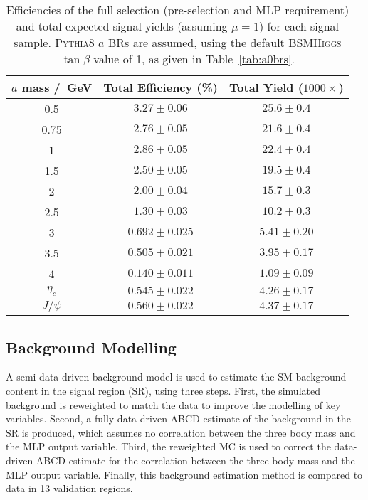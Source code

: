\documentclass[NOTE, atlasdraft=true, texlive=2017, UKenglish]{\ATLASLATEXPATH atlasdoc}
\begin{document}
\begin{table}[!htbp]{\footnotesize\renewcommand{\arraystretch}{1.2}
  \begin{center}
    \footnotesize
    \begin{tabular}{|c|cc|}
      \hline
      $a$ mass /~GeV & Total Efficiency (\%) & Total Yield ($1000\times$) \\
      \hline
      0.5 & $3.27 \pm 0.06$ & $25.6 \pm 0.4$ \\
      0.75 & $2.76 \pm 0.05$ & $21.6 \pm 0.4$ \\
      1 & $2.86 \pm 0.05$ & $22.4 \pm 0.4$ \\
      1.5 & $2.50 \pm 0.05$ & $19.5 \pm 0.4$ \\
      2 & $2.00 \pm 0.04$ & $15.7 \pm 0.3$ \\
      2.5 & $1.30 \pm 0.03$ & $10.2 \pm 0.3$ \\
      3 & $0.692 \pm 0.025$ & $5.41 \pm 0.20$ \\
      3.5 & $0.505 \pm 0.021$ & $3.95 \pm 0.17$ \\
      4 & $0.140 \pm 0.011$ & $1.09 \pm 0.09$ \\
      \hline
      $\eta_c$ & $0.545 \pm 0.022$ & $4.26 \pm 0.17$ \\
      $J/\psi$ & $0.560 \pm 0.022$ & $4.37 \pm 0.17$ \\
      \hline
    \end{tabular}
    \caption{Efficiencies of the full selection (pre-selection and MLP requirement) and total expected signal yields (assuming $\mu=1$) for each signal sample. \textsc{Pythia}8 $a$ BRs are assumed, using the default \textsc{BSMHiggs} $\tan\beta$ value of 1, as given in Table~\ref{tab:a0brs}.}
    \label{tab:sigyields}
  \end{center}}
\end{table}

\subsection{Background Modelling}
\label{sec:bkgdmodelling}

A semi data-driven background model is used to estimate the SM background content in the signal region (SR), using three steps. First, the simulated background is reweighted to match the data to improve the modelling of key variables. Second, a fully data-driven ABCD estimate of the background in the SR is produced, which assumes no correlation between the three body mass and the MLP output variable. Third, the reweighted MC is used to correct the data-driven ABCD estimate for the correlation between the three body mass and the MLP output variable. Finally, this background estimation method is compared to data in 13 validation regions.
\end{document}
